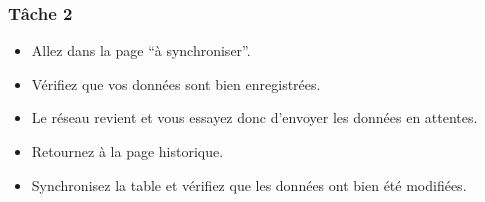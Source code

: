 \documentclass{EPL-master-thesis-covers-FR}
\begin{document}
				\subsubsection*{Tâche 2}
					\begin{itemize}
						\item Allez dans la page “à synchroniser”. 
						\item Vérifiez que vos données sont bien enregistrées. 
						\item Le réseau revient et vous essayez donc d’envoyer les données en attentes. 
						\item Retournez à la page historique. 
						\item Synchronisez la table et vérifiez que les données ont bien été modifiées. 
					\end{itemize}
			

	

	\setlength{\parskip}{0em}
	\backcoverpage
\end{document}
